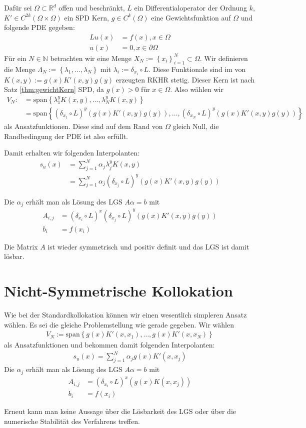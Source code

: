 Dafür sei $\Omega \subset \mathbb{R}^d$ offen und beschränkt, $L$ ein Differentialoperator der Ordnung $k$, $K' \in C^{2k}(\Omega \times \Omega)$ ein \ac{SPD} Kern, $g \in C^k(\Omega)$ eine Gewichtsfunktion auf $\Omega$ und folgende \ac{PDE} gegeben:
\begin{align*}
Lu(x) &= f(x), x \in \Omega\\
u(x) &= 0 , x \in \partial \Omega
\end{align*}
Für ein $N \in \mathbb{N}$ betrachten wir eine Menge $X_N := \left\{ x_i \right\}_{i=1}^N \subset \Omega$. Wir definieren die Menge $\Lambda_N := \left\{ \lambda_1, \dots, \lambda_N\right\}$ mit $\lambda_i :=  \delta_{x_i} \circ L$. Diese Funktionale sind im von \\$K(x,y) := g(x) K'(x,y) g(y)$ erzeugten \ac{RKHR} stetig. Dieser Kern ist nach Satz \ref{thm:gewichtKern} \ac{SPD}, da $g(x) > 0$ für $x \in \Omega$. Also wählen wir 
\begin{align*}
V_N :&= \text{span} \left\{\lambda_1^y K(x,y), \dots, \lambda_N^y K(x,y)\right\}\\
&= \text{span} \left\{(\delta_{x_1} \circ L)^y (g(x) K'(x,y) g(y)), \dots, (\delta_{x_N} \circ L)^y (g(x) K'(x,y) g(y))\right\}
\end{align*}
als Ansatzfunktionen. Diese sind auf dem Rand von $\Omega$ gleich Null, die Randbedingung der \gls{PDE} ist also erfüllt.

Damit erhalten wir folgenden Interpolanten:
\begin{align*}
s_u(x) &= \sum_{j=1}^N \alpha_j \lambda_j^y K(x,y)\\
&= \sum_{j=1}^N \alpha_j (\delta_{x_j} \circ L)^y( g(x)K'(x,y)g(y))
\end{align*}

Die $\alpha_j$ erhält man als Lösung des \ac{LGS} $A\alpha = b$ mit 
\begin{align*}
A_{i,j} &= (\delta_{x_i} \circ L)^x (\delta_{x_j} \circ L)^y (g(x)K'(x,y)g(y))\\
b_i &= f(x_i)
\end{align*}

Die Matrix $A$ ist wieder symmetrisch und positiv definit und das \ac{LGS} ist damit lösbar.
\section{Nicht-Symmetrische Kollokation}
Wie bei der Standardkollokation können wir einen wesentlich simpleren Ansatz wählen. Es sei die gleiche Problemstellung wie gerade gegeben. Wir wählen 
\begin{align*}
V_N:= \text{span} \left\{g(x)K'(x,x_1), \dots, g(x)K'(x,x_N)\right\}
\end{align*}
als Ansatzfunktionen und bekommen damit folgenden Interpolanten:
\begin{align*}
s_u (x) = \sum_{j=1}^N \alpha_j g(x)K'(x,x_j)
\end{align*}
Die $\alpha_j$ erhält man als Lösung des \ac{LGS} $A\alpha = b$ mit 
\begin{align*}
A_{i,j} &= (\delta_{x_i} \circ L)^x (g(x) K(x,x_j))\\
b_i &= f(x_i)
\end{align*}

Erneut kann man keine Aussage über die Lösbarkeit des \ac{LGS} oder über die numerische Stabilität des Verfahrens treffen.